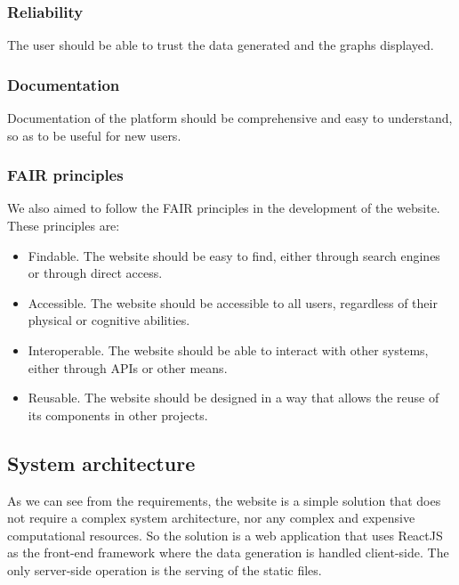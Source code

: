     \subsubsection{Reliability}

        The user should be able to trust the data generated and the graphs displayed.

    \subsubsection{Documentation}

        Documentation of the platform should be comprehensive and easy to understand, so as to be useful for new users.

    \subsubsection{FAIR principles}

    We also aimed to follow the FAIR principles in the development of the website. These principles are:

    \begin{itemize}
        \item Findable. The website should be easy to find, either through search engines or through direct access.
        \item Accessible. The website should be accessible to all users, regardless of their physical or cognitive abilities.
        \item Interoperable. The website should be able to interact with other systems, either through APIs or other means.
        \item Reusable. The website should be designed in a way that allows the reuse of its components in other projects.
    \end{itemize}


\subsection{System architecture}

    As we can see from the requirements, the website is a simple solution that does not require a complex system architecture, nor any complex and expensive computational resources. So the solution is a web application that uses ReactJS as the front-end framework where the data generation is handled client-side. The only server-side operation is the serving of the static files.

